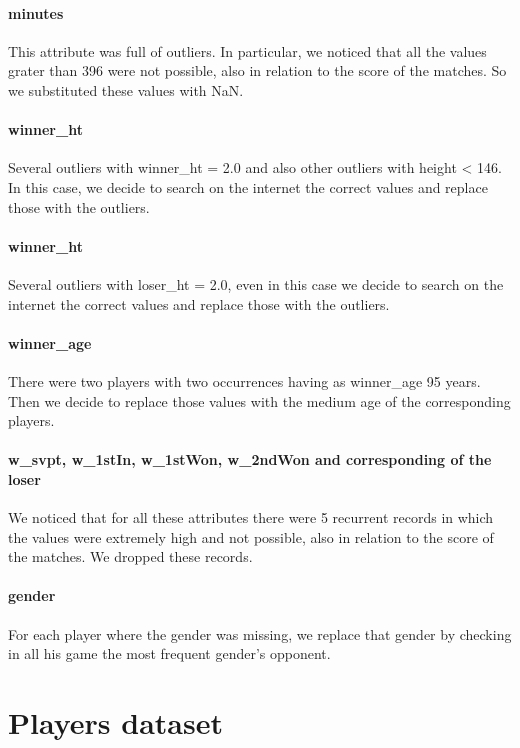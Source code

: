 \documentclass{article}
\begin{document}
\paragraph{minutes}
This attribute was full of outliers. In particular, we noticed that all the values grater than 396 were not possible, also in relation to the score of the matches. So we substituted these values with NaN.

\paragraph{winner\_ht}
Several outliers with winner\_ht = 2.0 and also other outliers with height < 146. In this case, we decide to search on the internet the correct values and replace those with the outliers.

\paragraph{winner\_ht}
Several outliers with loser\_ht = 2.0, even in this case we decide to search on the internet the correct values and replace those with the outliers.

\paragraph{winner\_age}
There were two players with two occurrences having as winner\_age 95 years. Then we decide to replace those values with the medium age of the corresponding players.

\paragraph{w\_svpt, w\_1stIn, w\_1stWon, w\_2ndWon and corresponding of the loser}
We noticed that for all these attributes there were 5 recurrent records in which the values were extremely high and not possible, also in relation to the score of the matches. We dropped these records.

\paragraph{gender}
For each player where the gender was missing, we replace that gender by checking in all his game the most frequent gender's opponent.

\section{Players dataset}
\end{document}
